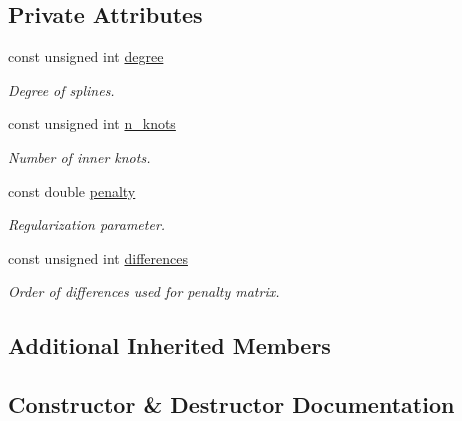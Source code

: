 \subsection*{Private Attributes}
\begin{DoxyCompactItemize}
\item 
const unsigned int \mbox{\hyperlink{classblearnerfactory_1_1_p_spline_blearner_factory_a8cfdf9e919e6392b2cba293dd5d931d5}{degree}}
\begin{DoxyCompactList}\small\item\em Degree of splines. \end{DoxyCompactList}\item 
const unsigned int \mbox{\hyperlink{classblearnerfactory_1_1_p_spline_blearner_factory_aa2fbd861eba158d220ecf96ddd1b50c5}{n\+\_\+knots}}
\begin{DoxyCompactList}\small\item\em Number of inner knots. \end{DoxyCompactList}\item 
const double \mbox{\hyperlink{classblearnerfactory_1_1_p_spline_blearner_factory_ae5bfe83b154898ad6cff26d56a82f540}{penalty}}
\begin{DoxyCompactList}\small\item\em Regularization parameter. \end{DoxyCompactList}\item 
const unsigned int \mbox{\hyperlink{classblearnerfactory_1_1_p_spline_blearner_factory_ae309d500aebc2abea96a639e431a3fb3}{differences}}
\begin{DoxyCompactList}\small\item\em Order of differences used for penalty matrix. \end{DoxyCompactList}\end{DoxyCompactItemize}
\subsection*{Additional Inherited Members}


\subsection{Constructor \& Destructor Documentation}
\mbox{\label{classblearnerfactory_1_1_p_spline_blearner_factory_ac5218d98736f787d4a2cca8faf317470}} 
